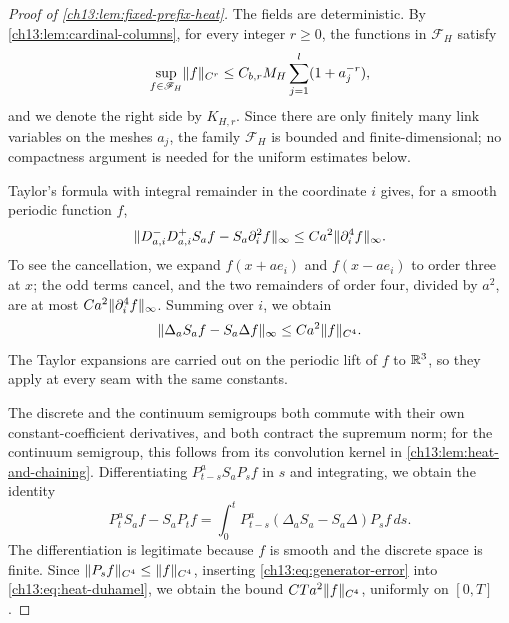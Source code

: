 \begin{proof}[Proof of \cref{ch13:lem:fixed-prefix-heat}]
The fields are deterministic. By \cref{ch13:lem:cardinal-columns}, for every integer $r\ge0$, the functions in $\mathscr F_H$ satisfy
\begin{equation}\label{ch13:eq:prefix-smooth-bounds}
 \sup_{f\in\mathscr F_H}\lVert f\rVert_{C^r}\le C_{b,r}M_H\sum_{j=1}^l(1+a_j^{-r}),
\end{equation}
and we denote the right side by $K_{H,r}$. Since there are only finitely many link variables on the meshes $a_j$, the family $\mathscr F_H$ is bounded and finite-dimensional; no compactness argument is needed for the uniform estimates below.

Taylor's formula with integral remainder in the coordinate $i$ gives, for a smooth periodic function $f$,
\[
 \lVert D_{a,i}^-D_{a,i}^+S_af-S_a\partial_i^2f\rVert_\infty\le Ca^2\lVert \partial_i^4f\rVert_\infty.
\]
To see the cancellation, we expand $f(x+ae_i)$ and $f(x-ae_i)$ to order three at $x$; the odd terms cancel, and the two remainders of order four, divided by $a^2$, are at most $Ca^2\lVert \partial_i^4f\rVert_\infty$. Summing over $i$, we obtain
\begin{equation}\label{ch13:eq:generator-error}
 \lVert \Delta_aS_af-S_a\Delta f\rVert_\infty\le Ca^2\lVert f\rVert_{C^4}.
\end{equation}
The Taylor expansions are carried out on the periodic lift of $f$ to $\mathbb R^3$, so they apply at every seam with the same constants.

The discrete and the continuum semigroups both commute with their own constant-coefficient derivatives, and both contract the supremum norm; for the continuum semigroup, this follows from its convolution kernel in \cref{ch13:lem:heat-and-chaining}. Differentiating $P_{t-s}^aS_aP_sf$ in $s$ and integrating, we obtain the identity
\begin{equation}\label{ch13:eq:heat-duhamel}
 P_t^aS_af-S_aP_tf=\int_0^tP_{t-s}^a(\Delta_aS_a-S_a\Delta)P_sf\,ds.
\end{equation}
The differentiation is legitimate because $f$ is smooth and the discrete space is finite. Since $\lVert P_sf\rVert_{C^4}\le\lVert f\rVert_{C^4}$, inserting \eqref{ch13:eq:generator-error} into \eqref{ch13:eq:heat-duhamel}, we obtain the bound $CTa^2\lVert f\rVert_{C^4}$, uniformly on $[0,T]$.


\end{proof}
